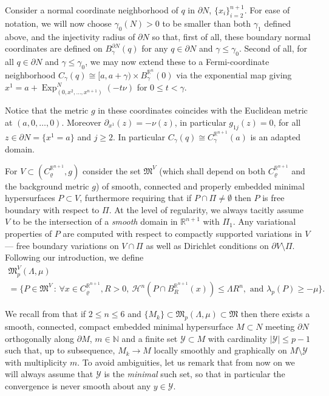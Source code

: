 \documentclass[10pt]{amsart}
\let\mathcal\mathscr
\newcommand{\sep}{\,:\,}
\DeclareMathOperator{\Exp}{Exp}
\theoremstyle{definition}
\newcommand{\R}{\mathbb{R}}
\newcommand{\h}{\mathscr{H}}
\begin{document}
Consider a normal coordinate neighborhood of $q$ in $\partial N$, $\{x_i\}_{i=2}^{n+1}$. For ease of nota\-tion, we will now choose $\gamma_0(N) >0$ to be smaller than both $\gamma_1$ defined above, and the injectivity radius of $\partial N$ so that, first of all, these boundary normal coordinates are defined on $B^{\partial N}_\gamma (q)$ for any $q\in \partial N$ and $\gamma \leq \gamma_0$. Second of all, for all $q\in \partial N$ and $\gamma\leq \gamma_0$, we may now extend these to a Fermi-coordinate neighborhood $C_{\gamma}(q) \cong [a,a+\gamma)\times B^{\R^n}_\gamma (0)$ via the exponential map giving $x^{1} = a+ \Exp^N_{(0,x^2,\dots,x^{n+1})} (-t\nu)$ for $0\leq t<\gamma$.

Notice that the metric $g$ in these coordinates coincides with the Euclidean metric at $(a,0,\dots,0)$. Moreover $\partial_{x^1}(z) = -\nu(z)$, in particular $g_{1j}(z)=0$, for all $z\in \partial N = \{x^1=a\}$ and $j\geq 2$. In particular $C_\gamma(q)\cong C^{\R^{n+1}}_\gamma(a)$ is an adapted domain. 

For $V\subset (C^{\R^{n+1}}_\varrho,g)$ consider the set $\mathfrak{M}^{V}$ (which shall depend on both $C^{\R^{n+1}}_\varrho$ and the background metric $g$) of smooth, connected and properly embedded minimal hypersurfaces $P\subset V$, furthermore requiring that if $P\cap \Pi \neq \emptyset$ then $P$ is free boundary with respect to $\Pi$. At the level of regularity, we always tacitly assume $V$ to be the intersection of a \emph{smooth} domain in $\R^{n+1}$ with $\Pi_1$. Any variational properties of $P$ are computed with respect to compactly supported variations in $V$ --- \ie free boundary variations on $V\cap \Pi$ as well as Dirichlet conditions on $\partial V\setminus \Pi$. Following our introduction, we define
\begin{multline*}
\mathfrak{M}^{V}_p(\Lambda,\mu)\\
= \big\{ P \in \mathfrak{M}^{V}\sep \forall x\in C^{\R^{n+1}}_\varrho, R>0, \ \h^n(P\cap B^{\R^{n+1}}_R(x))\leq \Lambda R^n, \text{ and }\lambda_p(P) \geq -\mu \big\}.
\end{multline*}

We recall from \cite[Th.\,29]{ACS17} that if $2\leq n\leq 6$ and $\{M_k\}\subset \mathfrak{M}_p(\Lambda, \mu) \subset \mathfrak{M}$ then there exists a smooth, connected, compact embedded minimal hypersurface $M\subset N$ meeting $\partial N$ orthogonally along $\partial M$, $m\in \mathbb{N}$ and a finite set $\mathcal{Y}\subset M$ with cardinality $|\mathcal{Y}|\leq p-1$ such that, up to subsequence, $M_k \to M$ locally smoothly and graphically on $M\setminus \mathcal{Y}$ with multiplicity $m$. To avoid ambiguities, let us remark that from now on we will always assume that $\mathcal{Y}$ is the \emph{minimal} such set, so that in particular the convergence is never smooth about any $y\in\mathcal{Y}$.
\end{document}
